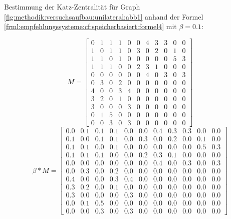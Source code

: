 Bestimmung der Katz-Zentralität für Graph \ref{fig:methodik:versuchsaufbau:unilateral:abb1} anhand der Formel \ref{frml:empfehlungssysteme:cf:speicherbasiert:formel4} mit $\beta = 0.1$:

\begin{equation}
	M = \begin{bmatrix}
		0 & 1 & 1 & 1 & 0 & 0 & 4 & 3 & 3 & 0 & 0\\
		1 & 0 & 1 & 1 & 0 & 3 & 0 & 2 & 0 & 1 & 0\\
		1 & 1 & 0 & 1 & 0 & 0 & 0 & 0 & 0 & 5 & 3\\
		1 & 1 & 1 & 0 & 0 & 2 & 3 & 1 & 0 & 0 & 0\\
		0 & 0 & 0 & 0 & 0 & 0 & 4 & 0 & 3 & 0 & 3\\
		0 & 3 & 0 & 2 & 0 & 0 & 0 & 0 & 0 & 0 & 0\\
		4 & 0 & 0 & 3 & 4 & 0 & 0 & 0 & 0 & 0 & 0\\
		3 & 2 & 0 & 1 & 0 & 0 & 0 & 0 & 0 & 0 & 0\\
		3 & 0 & 0 & 0 & 3 & 0 & 0 & 0 & 0 & 0 & 0\\
		0 & 1 & 5 & 0 & 0 & 0 & 0 & 0 & 0 & 0 & 0\\
		0 & 0 & 3 & 0 & 3 & 0 & 0 & 0 & 0 & 0 & 0
	\end{bmatrix}
	\label{frml:berechnungDerKatzZentralitaetPseudoMitarbeiter:formel1}
\end{equation}
\begin{equation}
	\beta * M = \begin{bmatrix}
		0.0 & 0.1 & 0.1 & 0.1 & 0.0 & 0.0 & 0.4 & 0.3 & 0.3 & 0.0 & 0.0\\
		0.1 & 0.0 & 0.1 & 0.1 & 0.0 & 0.3 & 0.0 & 0.2 & 0.0 & 0.1 & 0.0\\
		0.1 & 0.1 & 0.0 & 0.1 & 0.0 & 0.0 & 0.0 & 0.0 & 0.0 & 0.5 & 0.3\\
		0.1 & 0.1 & 0.1 & 0.0 & 0.0 & 0.2 & 0.3 & 0.1 & 0.0 & 0.0 & 0.0\\
		0.0 & 0.0 & 0.0 & 0.0 & 0.0 & 0.0 & 0.4 & 0.0 & 0.3 & 0.0 & 0.3\\
		0.0 & 0.3 & 0.0 & 0.2 & 0.0 & 0.0 & 0.0 & 0.0 & 0.0 & 0.0 & 0.0\\
		0.4 & 0.0 & 0.0 & 0.3 & 0.4 & 0.0 & 0.0 & 0.0 & 0.0 & 0.0 & 0.0\\
		0.3 & 0.2 & 0.0 & 0.1 & 0.0 & 0.0 & 0.0 & 0.0 & 0.0 & 0.0 & 0.0\\
		0.3 & 0.0 & 0.0 & 0.0 & 0.3 & 0.0 & 0.0 & 0.0 & 0.0 & 0.0 & 0.0\\
		0.0 & 0.1 & 0.5 & 0.0 & 0.0 & 0.0 & 0.0 & 0.0 & 0.0 & 0.0 & 0.0\\
		0.0 & 0.0 & 0.3 & 0.0 & 0.3 & 0.0 & 0.0 & 0.0 & 0.0 & 0.0 & 0.0
	\end{bmatrix}
	\label{frml:katzZentralitaetPseudoMitarbeiter:formel2}
\end{equation}
